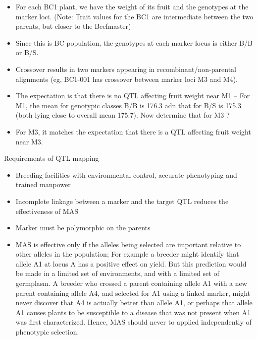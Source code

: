 \documentclass[11pt,dvipsnames,ignorenonframetext,aspectratio=169]{beamer}
\providecommand{\tightlist}{%
  \setlength{\itemsep}{0pt}\setlength{\parskip}{0pt}}
\begin{document}
\begin{frame}{}
\protect\hypertarget{section-8}{}
\begin{itemize}
\tightlist
\item
  For each BC1 plant, we have the weight of its fruit and the genotypes
  at the marker loci. (Note: Trait values for the BC1 are intermediate
  between the two parents, but closer to the Beefmaster)
\item
  Since this is BC population, the genotypes at each marker locus is
  either B/B or B/S.
\item
  Crossover results in two markers appearing in recombinant/non-parental
  alignments (eg, BC1-001 has crossover between marker loci M3 and M4).
\item
  The expectation is that there is no QTL affecting fruit weight near M1
  -- For M1, the mean for genotypic classes B/B is 176.3 adn that for
  B/S is 175.3 (both lying close to overall mean 175.7). Now determine
  that for M3 ?
\item
  For M3, it matches the expectation that there is a QTL affecting fruit
  weight near M3.
\end{itemize}
\end{frame}

\begin{frame}{Requirements of QTL mapping}
\protect\hypertarget{requirements-of-qtl-mapping}{}
\begin{itemize}
\tightlist
\item
  Breeding facilities with environmental control, accurate phenotyping
  and trained manpower
\item
  Incomplete linkage between a marker and the target QTL reduces the
  effectiveness of MAS
\item
  Marker must be polymorphic on the parents
\item
  MAS is effective only if the alleles being selected are important
  relative to other alleles in the population; For example a breeder
  might identify that allele A1 at locus A has a positive effect on
  yield. But this prediction would be made in a limited set of
  environments, and with a limited set of germplasm. A breeder who
  crossed a parent containing allele A1 with a new parent containing
  allele A4, and selected for A1 using a linked marker, might never
  discover that A4 is actually better than allele A1, or perhaps that
  allele A1 causes plants to be susceptible to a disease that was not
  present when A1 was first characterized. Hence, MAS should never to
  applied independently of phenotypic selection.
\end{itemize}
\end{frame}
\end{document}

